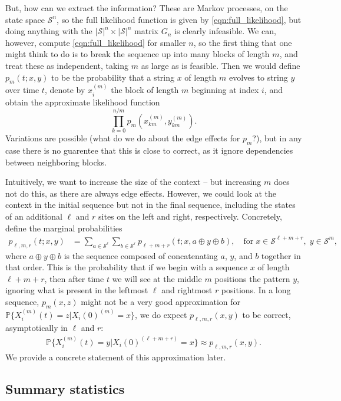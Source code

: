 \documentclass{article}
\renewcommand{\P}{\mathbb{P}}
\newcommand{\calS}{\mathcal{S}}  %
\newcommand{\join}{\oplus}  %
\theoremstyle{plain}
\theoremstyle{definition}
\begin{document}
But, how can we extract the information?
These are Markov processes, on the state space $\calS^n$, 
so the full likelihood function is given by \eqref{eqn:full_likelihood},
but doing anything with the $|\calS|^n \times |\calS|^n$ matrix $G_n$ is clearly infeasible.
We can, however, compute \eqref{eqn:full_likelihood} for smaller $n$,
so the first thing that one might think to do is to break the sequence up into many blocks of length $m$,
and treat these as independent, taking $m$ as large as is feasible.
Then we would define $p_m(t;x,y)$ to be the probability that a string $x$ of length $m$ evolves to string $y$ over time $t$,
denote by $x_i^{(m)}$ the block of length $m$ beginning at index $i$,
and obtain the approximate likelihood function
\[
  \prod_{k=0}^{n/m} p_m(x_{km}^{(m)},y_{km}^{(m)}) .
\]
Variations are possible (what do we do about the edge effects for $p_m$?),
but in any case there is no guarentee that this is close to correct,
as it ignore dependencies between neighboring blocks.

Intuitively, we want to increase the size of the context 
-- but increasing $m$ does not do this, as there are always edge effects.
However, we could look at the context in the initial sequence but not in the final sequence,
including the states of an additional $\ell$ and $r$ sites on the left and right, respectively.
Concretely, define the marginal probabilities
\begin{align}
  p_{\ell,m,r}(t;x,y) &= \sum_{a \in \calS^\ell} \sum_{b \in \calS^r} p_{\ell+m+r}(t;x,a \join y \join b) , \quad \text{for}\; x \in \calS^{\ell+m+r}, \; y \in \calS^m ,
\end{align}
where $a \join y \join b$ is the sequence composed of concatenating $a$, $y$, and $b$ together in that order.
This is the probability that if we begin with a sequence $x$ of length $\ell+m+r$, 
then after time $t$ we will see at the middle $m$ positions the pattern $y$,
ignoring what is present in the leftmost $\ell$ and rightmost $r$ positions.
In a long sequence, $p_m(x,z)$ might not be a very good approximation for $\P\{ X_i^{(m)}(t) = z | X_i(0)^{(m)} = x \}$,
we do expect $p_{\ell,m,r}(x,y)$ to be correct, asymptotically in $\ell$ and $r$:
\begin{align} \label{eqn:window_approx}
  \P\{ X_i^{(m)}(t) = y | X_i(0)^{(\ell+m+r)} = x \} \approx p_{\ell,m,r}(x,y) .
\end{align}
We provide a concrete statement of this approximation later.

\subsection{Summary statistics}
\end{document}
